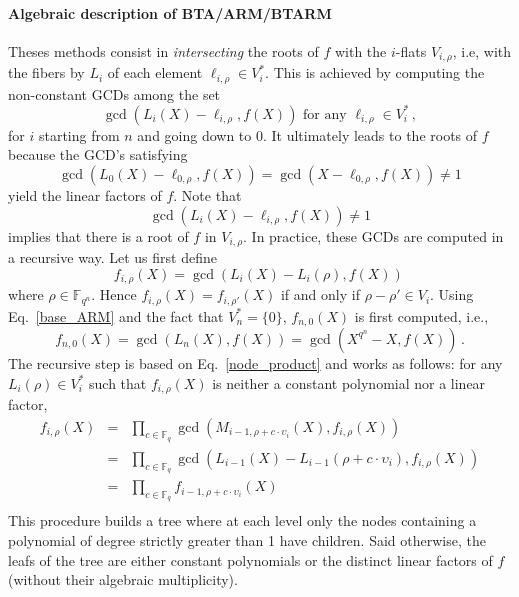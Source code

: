 \documentclass{article}
\newcommand{\ff}[1]{\mathbb{F}_{#1}}
\newcommand{\qq}{q}
\newcommand{\nn}{n}
\newcommand{\qn}{{\qq^\nn}}
\newcommand{\basef}{\ff{\qq}}
\newcommand{\extf}{\ff{\qn}}
\begin{document}
\paragraph{Algebraic description of BTA/ARM/BTARM} Theses methods consist in \emph{intersecting} the roots of $f$ with the $i$-flats $V_{i,\rho}$, i.e, with the fibers by $L_i$ of each element $\ell_{i,\rho} \in V_i^\ast$.
This is achieved by computing the non-constant GCDs among the set
\begin{equation}
\label{base_ARM}
\gcd(L_i(X)-\ell_{i,\rho},f(X)) \mbox{ for any } \ell_{i,\rho} \in V_i^\ast\,,
\end{equation}
for $i$ starting from $n$ and going down to 0.
It ultimately leads to the roots of $f$ because the GCD's satisfying
$$\gcd(L_0(X)-\ell_{0,\rho},f(X))=\gcd(X-\ell_{0,\rho},f(X)) \ne 1$$
yield the linear factors of $f$.
Note that
\begin{equation}
\label{eq:duality-gcd}
\gcd(L_i(X)-\ell_{i,\rho},f(X)) \ne 1
\end{equation}
implies that there is a root of $f$ in $V_{i,\rho}$.
In practice, these GCDs are computed in a recursive way. Let us first define
$$f_{i,\rho}(X)=\gcd(L_i(X)-L_i(\rho),f(X))\,$$
where $\rho \in \extf$. Hence $f_{i,\rho}(X)=f_{i,\rho'}(X)$ if and only if $\rho-\rho' \in V_i$.
Using Eq.~\eqref{base_ARM} and the fact that $V_n^\ast=\{0\}$, $f_{n,0}(X)$ is first computed, i.e.,
$$f_{n,0}(X)=\gcd(L_n(X),f(X))=\gcd(X^{q^\nn}-X,f(X))\,.$$
The recursive step is based on Eq.~\eqref{node_product} and works as follows: for any $L_i(\rho) \in V_i^\ast$ such that $f_{i,\rho}(X)$ is neither a constant polynomial nor a linear factor,
$$
\begin{array}{lll}
f_{i,\rho}(X)&=&\prod_{c \in \basef} \gcd(M_{i-1,\rho+c \cdot \upsilon_i}(X),f_{i,\rho}(X)) \\
&=&\prod_{c \in \basef} \gcd(L_{i-1}(X)-L_{i-1}(\rho+c \cdot \upsilon_i),f_{i,\rho}(X)) \\
&=&\prod_{c \in \basef} f_{i-1,\rho+c \cdot \upsilon_i}(X)\\
\end{array}
$$
This procedure builds a tree where at each level only the nodes containing a polynomial of degree strictly greater than 1 have children. Said otherwise, the leafs of the tree are either constant polynomials or the distinct linear factors of $f$ (without their algebraic multiplicity).
\end{document}
